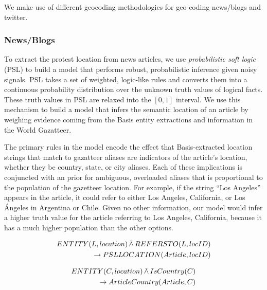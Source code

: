 %
%

We make use of different geocoding methodologies for geo-coding news/blogs and twitter.

\subsubsection{News/Blogs}
\label{subsection:geocoding}
To extract the protest location from news articles, we use \emph{probabilistic soft logic} (PSL) \cite{broecheler:uai10} to build a model that performs robust, probabilistic inference given noisy signals. PSL takes a set of weighted, logic-like rules and converts them into a continuous probability distribution over the unknown truth values of logical facts. These truth values in PSL are relaxed into the $[0,1]$ interval. We use this mechanism to build a model that infers the semantic location of an article by weighing evidence coming from the Basis entity extractions and information in the World Gazatteer. 

The primary rules in the model encode the effect that Basis-extracted location strings that match to gazatteer aliases are indicators of the article's location, whether they be country, state, or city aliases. Each of these implications is conjuncted with an prior for ambiguous, overloaded aliases that is proportional to the population of the gazetteer location. For example, if the string ``Los Angeles'' appears in the article, it could refer to either Los Angeles, California, or Los \'{A}ngeles in Argentina or Chile. Given no other information, our model would infer a higher truth value for the article referring to Los Angeles, California, because it has a much higher population than the other options. 

\begin{align*}
    \begin{split}
    ENTITY(L, location) \softand REFERSTO(L, locID)\\
    \rightarrow PSLLOCATION(Article, locID)
\end{split}
\end{align*}


\begin{align*}
    \begin{split}
        ENTITY(C, location) \softand IsCountry(C)\\
    \rightarrow ArticleCountry(Article, C)
\end{split}
\end{align*}


